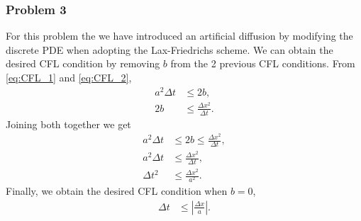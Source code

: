 \subsubsection*{Problem 3}
For this problem the we have introduced an artificial diffusion by modifying the discrete PDE when adopting the Lax-Friedrichs scheme. We can obtain the desired CFL condition by removing $b$ from the 2 previous CFL conditions. From \eqref{eq:CFL_1} and \eqref{eq:CFL_2},
\begin{align*}
a^2\Delta t&\leq 2b,\\
2b &\leq \frac{\Delta x^2}{\Delta t}.
\end{align*}
Joining both together we get
\begin{align*}
a^2\Delta t&\leq 2b\leq \frac{\Delta x^2}{\Delta t},\\
a^2\Delta t&\leq \frac{\Delta x^2}{\Delta t},\\
\Delta t^2&\leq \frac{\Delta x^2}{a^2}.
\end{align*}
Finally, we obtain the desired CFL condition when $b=0$,
\begin{align*}
\Delta t&\leq \left|\frac{\Delta x}{a}\right|.
\end{align*}